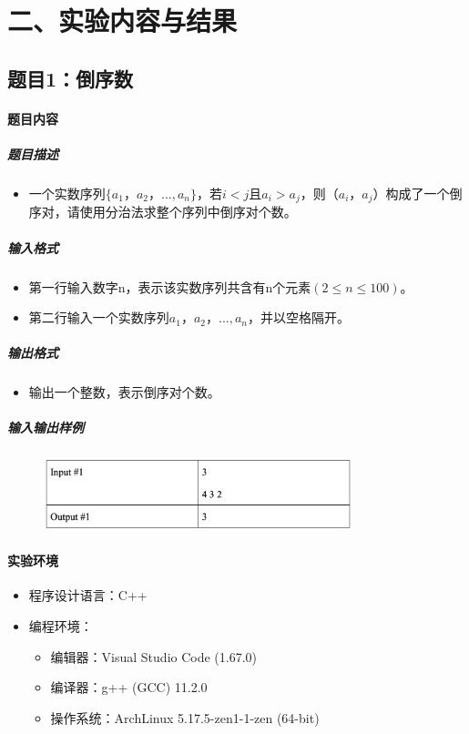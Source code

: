 \documentclass[12pt,a4paper]{ctexart}
\begin{document}
\vspace{5pt}

\section*{二、实验内容与结果}
\subsection*{题目1：倒序数}
\paragraph{题目内容}
\subparagraph{题目描述}
\begin{itemize}
    \item 一个实数序列$\{a_1，a_2，..., a_n\}$，若$i<j$且$a_i>a_j$，则$（a_i，a_j）$构成了一个倒序对，请使用分治法求整个序列中倒序对个数。
\end{itemize}

\subparagraph{输入格式}
    \begin{itemize}
        \item 第一行输入数字n，表示该实数序列共含有n个元素$(2 \leq n \leq 100)$。 
        \item 第二行输入一个实数序列$a_1，a_2，..., a_n$，并以空格隔开。
    \end{itemize}
\subparagraph{输出格式}
    \begin{itemize}
        \item 输出一个整数，表示倒序对个数。
    \end{itemize}

\subparagraph{输入输出样例}
    \begin{figure}[h]
        \centering
        \includegraphics[width=0.80\textwidth]{q1_iodata.png}
    \end{figure}

\vspace{5pt}

\paragraph{实验环境}
\begin{itemize}
    \item 程序设计语言：C++
    \item 编程环境：
    \begin{itemize}
        \item 编辑器：Visual Studio Code (1.67.0)
        \item 编译器：g++ (GCC) 11.2.0
        \item 操作系统：ArchLinux 5.17.5-zen1-1-zen (64-bit)
    \end{itemize}
\end{itemize}
\end{document}
